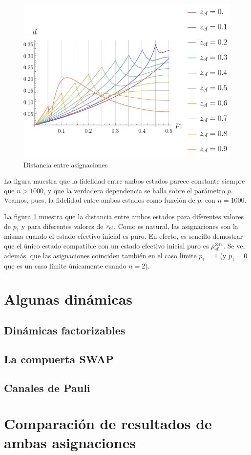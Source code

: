 \begin{figure}[ht!]
    \centering
      \includegraphics[width=0.9\linewidth]{chapter4/figures/maxavgdisr.png}
    \caption{Distancia entre asignaciones}
    \label{fig:AvgMaxDist}
\end{figure}

La figura  muestra que la fidelidad entre ambos estados parece constante siempre que $n>1000$, y que la verdadera dependencia se halla sobre el parámetro $p$. Veamos, pues, la fidelidad entre ambos estados como función de $p$, con $n=1000$.

La figura \ref{fig:AvgMaxDist} muestra que la distancia entre ambos estados para diferentes valores de $p_{1}$ y para diferentes valores de $r_{\text{ef}}$. Como es natural, las asignaciones son la misma cuando el estado efectivo inicial es puro. En efecto, es sencillo demostrar que el único estado compatible con un estado efectivo inicial puro es $\rho_{\text{ef}}^{\otimes n}$. Se ve, además, que las asignaciones coinciden también en el caso límite $p_{1}=1$ (y $p_{1}=0$ que es un caso límite únicamente cuando $n=2$).

\section{Algunas dinámicas}

\subsection{Dinámicas factorizables}

\subsection{La compuerta SWAP}

\subsection{Canales de Pauli}

\section{Comparación de resultados de ambas asignaciones}